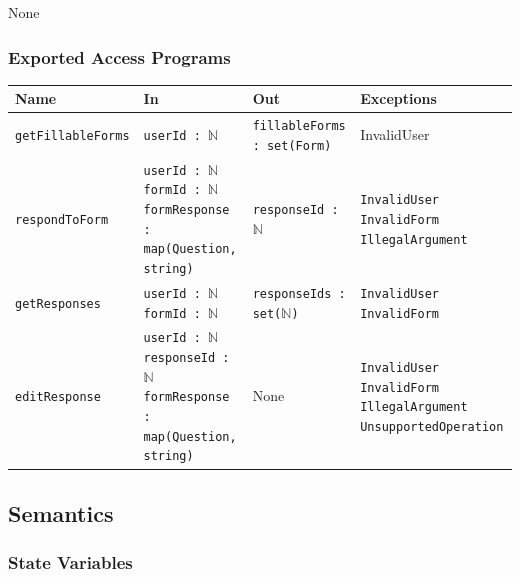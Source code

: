 \documentclass[12pt, titlepage]{article}
\begin{document}
None

\subsubsection{Exported Access Programs}

\begin{center}
\begin{tabularx}{\textwidth}{p{} p{} p{} p{}}
\hline
\textbf{Name} & \textbf{In} & \textbf{Out} & \textbf{Exceptions} \\
\hline
\texttt{getFillableForms} & \texttt{userId : $\mathbb{N}$} & \texttt{fillableForms : set(Form)} & InvalidUser \\
\hline
\texttt{respondToForm} & \texttt{userId : $\mathbb{N}$ \newline formId : $\mathbb{N}$ \newline formResponse : map(Question, string)} & \texttt{responseId : $\mathbb{N}$} & \texttt{InvalidUser} \newline \texttt{InvalidForm} \newline \texttt{IllegalArgument} \\
\hline
\texttt{getResponses} & \texttt{userId : $\mathbb{N}$ \newline formId : $\mathbb{N}$} & \texttt{responseIds : set($\mathbb{N}$)} & \texttt{InvalidUser} \newline \texttt{InvalidForm} \\
\hline
\texttt{editResponse} & \texttt{userId : $\mathbb{N}$ \newline responseId : $\mathbb{N}$ \newline formResponse : map(Question, string)} & None & \texttt{InvalidUser} \newline \texttt{InvalidForm} \newline \texttt{IllegalArgument} \newline \texttt{UnsupportedOperation} \\
\hline
\end{tabularx}
\end{center}

\subsection{Semantics}

\subsubsection{State Variables}
\end{document}

